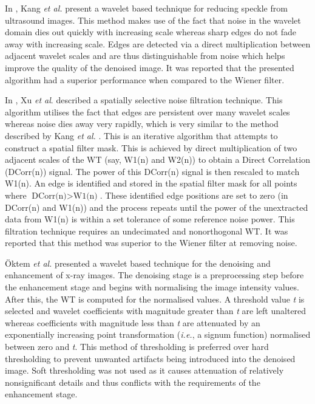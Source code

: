 \documentclass[12pt]{report}
\begin{document}
In \cite{kangLeeHong}, Kang \emph{et al.} present a wavelet based technique for reducing speckle from ultrasound
images. This method makes use of the fact that noise in the wavelet domain dies out quickly with
increasing scale whereas sharp edges do not fade away with increasing scale. Edges are detected via a direct
multiplication between adjacent wavelet scales and are thus distinguishable from noise which helps improve
the quality of the denoised image. It was reported that the presented algorithm had a superior performance 
when compared to the Wiener filter.

In \cite{xu94}, Xu \emph{et al}. described a spatially selective noise filtration technique. 
This algorithm utilises the fact that edges are persistent over many wavelet scales whereas noise dies away 
very rapidly, which is very similar to the method described by Kang \emph{et al.} \cite{kangLeeHong}.
This is an iterative algorithm that attempts to construct a spatial filter mask. This is achieved by direct multiplication of two adjacent
scales of the WT (say, W1(n) and W2(n)) to obtain a Direct Correlation (DCorr(n)) signal. The power of this
DCorr(n) signal is then rescaled to match W1(n). An edge is identified and stored in the spatial filter mask for all points where
$\mbox{DCorr(n)} > \mbox{W1(n)}$. These identified edge positions are set to zero (in DCorr(n) and W1(n)) and the process repeats until the power of the
unextracted data from W1(n) is within a set tolerance of some reference noise power.
This filtration technique requires an undecimated and nonorthogonal WT.
It was reported that this method was superior to the Wiener filter at removing noise.

\"{O}ktem \emph{et al.} \cite{oktemXray} presented a wavelet based technique for the denoising
and enhancement of x-ray images. The denoising stage is a preprocessing step before 
the enhancement stage and begins with normalising the image intensity values.
After this, the WT is computed for the normalised values. A threshold
value \emph{t} is selected and wavelet coefficients with magnitude greater than \emph{t} are 
left unaltered whereas coefficients with magnitude less than \emph{t} are attenuated by an 
exponentially increasing point transformation (\emph{i.e.}, a signum function) 
normalised between zero and \emph{t}. This method of thresholding is preferred over 
hard thresholding 
to prevent unwanted artifacts being introduced into the denoised image.
Soft thresholding was not used as it causes attenuation of relatively nonsignificant details
and thus conflicts with the requirements of the enhancement stage. 
\end{document}
